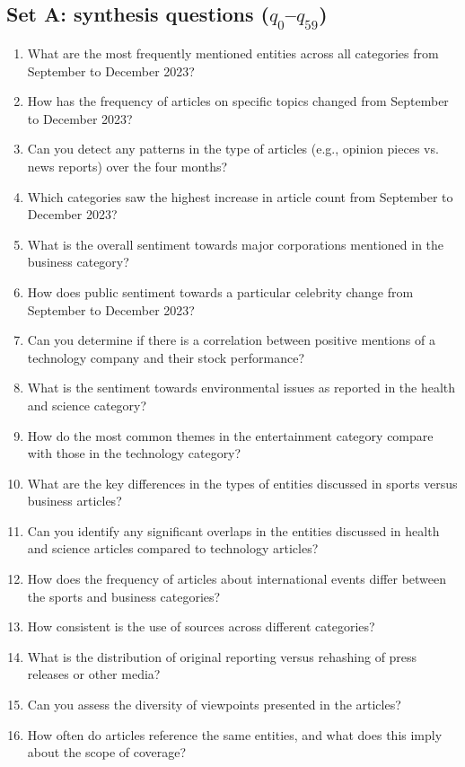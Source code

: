 \subsection{Set A: synthesis questions (\texorpdfstring{$q_0$--$q_{59}$}{q0-q59})}
\begin{footnotesize}
\begin{enumerate}\setlength{\itemsep}{1pt}
\item What are the most frequently mentioned entities across all categories from September to December 2023?
\item How has the frequency of articles on specific topics changed from September to December 2023?
\item Can you detect any patterns in the type of articles (e.g., opinion pieces vs. news reports) over the four months?
\item Which categories saw the highest increase in article count from September to December 2023?
\item What is the overall sentiment towards major corporations mentioned in the business category?
\item How does public sentiment towards a particular celebrity change from September to December 2023?
\item Can you determine if there is a correlation between positive mentions of a technology company and their stock performance?
\item What is the sentiment towards environmental issues as reported in the health and science category?
\item How do the most common themes in the entertainment category compare with those in the technology category?
\item What are the key differences in the types of entities discussed in sports versus business articles?
\item Can you identify any significant overlaps in the entities discussed in health and science articles compared to technology articles?
\item How does the frequency of articles about international events differ between the sports and business categories?
\item How consistent is the use of sources across different categories?
\item What is the distribution of original reporting versus rehashing of press releases or other media?
\item Can you assess the diversity of viewpoints presented in the articles?
\item How often do articles reference the same entities, and what does this imply about the scope of coverage?

\end{enumerate}
\end{footnotesize}
